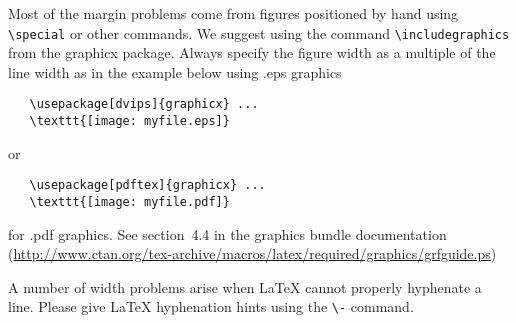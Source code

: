 \documentclass{article}
\begin{document}
Most of the margin problems come from figures positioned by hand using
\verb+\special+ or other commands. We suggest using the command
\verb+\includegraphics+
from the graphicx package. Always specify the figure width as a multiple of
the line width as in the example below using .eps graphics
\begin{verbatim}
   \usepackage[dvips]{graphicx} ...
   \texttt{[image: myfile.eps]}
\end{verbatim}
or %
\begin{verbatim}
   \usepackage[pdftex]{graphicx} ...
   \texttt{[image: myfile.pdf]}
\end{verbatim}
for .pdf graphics.
See section~4.4 in the graphics bundle documentation (\url{http://www.ctan.org/tex-archive/macros/latex/required/graphics/grfguide.ps})

A number of width problems arise when LaTeX cannot properly hyphenate a
line. Please give LaTeX hyphenation hints using the \verb+\-+ command.

    
    
\end{document}
